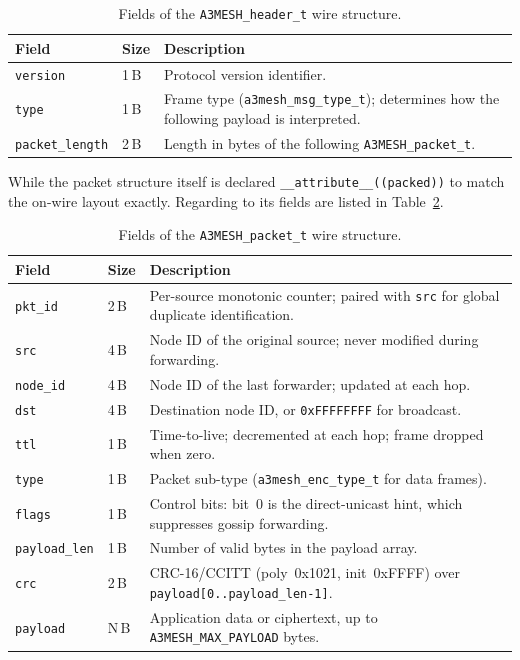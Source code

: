 \documentclass[english,bachelor]{tfgitic}[2026/01/22]
\begin{document}
\begin{table}[htbp]
    \centering
    \caption{Fields of the \texttt{A3MESH\_header\_t} wire structure.}
    \label{tab:fw_header_fields}
    \begin{tabular}{llp{7cm}}
        \toprule
        \textbf{Field} & \textbf{Size} & \textbf{Description} \\
        \midrule
        \texttt{version}       & 1\,B & Protocol version identifier. \\
        \texttt{type}          & 1\,B & Frame type (\texttt{a3mesh\_msg\_type\_t}); determines how the following payload is interpreted. \\
        \texttt{packet\_length} & 2\,B & Length in bytes of the following \texttt{A3MESH\_packet\_t}. \\
        \bottomrule
    \end{tabular}
\end{table}

While the packet structure itself is declared \texttt{\_\_attribute\_\_((packed))} to match the
on-wire layout exactly. Regarding to its fields are listed in Table~\ref{tab:fw_packet_fields}.

\begin{table}[htbp]
    \centering
    \caption{Fields of the \texttt{A3MESH\_packet\_t} wire structure.}
    \label{tab:fw_packet_fields}
    \begin{tabular}{llp{7cm}}
        \toprule
        \textbf{Field} & \textbf{Size} & \textbf{Description} \\
        \midrule
        \texttt{pkt\_id}      & 2\,B & Per-source monotonic counter; paired with \texttt{src} for global duplicate identification. \\
        \texttt{src}          & 4\,B & Node ID of the original source; never modified during forwarding. \\
        \texttt{node\_id}     & 4\,B & Node ID of the last forwarder; updated at each hop. \\
        \texttt{dst}          & 4\,B & Destination node ID, or \texttt{0xFFFFFFFF} for broadcast. \\
        \texttt{ttl}          & 1\,B & Time-to-live; decremented at each hop; frame dropped when zero. \\
        \texttt{type}         & 1\,B & Packet sub-type (\texttt{a3mesh\_enc\_type\_t} for data frames). \\
        \texttt{flags}        & 1\,B & Control bits: bit~0 is the direct-unicast hint, which suppresses gossip forwarding. \\
        \texttt{payload\_len} & 1\,B & Number of valid bytes in the payload array. \\
        \texttt{crc}          & 2\,B & CRC-16/CCITT (poly~0x1021, init~0xFFFF) over \texttt{payload[0..payload\_len-1]}. \\
        \texttt{payload}      & N\,B & Application data or ciphertext, up to \texttt{A3MESH\_MAX\_PAYLOAD} bytes. \\
        \bottomrule
    \end{tabular}
\end{table}
\end{document}
